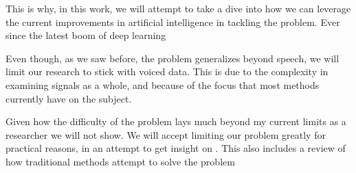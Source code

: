 \documentclass{book}
\begin{document}
\par
This is why, in this work, we will attempt to take a dive into how we can leverage the current improvements in artificial intelligence in tackling the problem. Ever since the latest boom of deep learning \cite{DeepLearning}
\par
Even though, as we saw before, the problem generalizes beyond speech, we will limit our research to stick with voiced data. This is due to the complexity in examining signals as a whole, and because of the focus that most methods currently have on the subject.
\par
Given how the difficulty of the problem lays much beyond my current limits as a researcher we will not show. We will accept limiting our problem greatly for practical reasons, in an attempt to get insight on . This also includes a review of how traditional methods attempt to solve the problem



\end{document}
